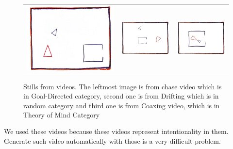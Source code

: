 \documentclass[11pt]{report}
\begin{document}
\begin{figure}[H]
\begin{tabular}{ccc}
\includegraphics[scale=0.2]{chase348.png} &
\includegraphics[scale=0.4]{drift271.png} &
\includegraphics[scale=0.4]{coax88.png}
\end{tabular}    
\label{tab:gt}
\caption{Stills from videos. The leftmost image is from chase video which is in Goal-Directed category, second one is from Drifting which is in random category and third one is from Coaxing video, which is in Theory of Mind Category}
\end{figure}
We used these videos because these videos represent intentionality in them. Generate such video automatically with those is a very difficult problem.
\end{document}
